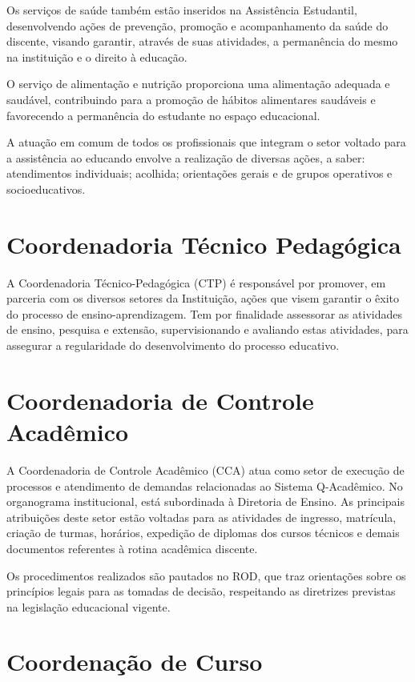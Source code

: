 \documentclass[
	12pt,				%
	openright,			%
	twoside,			%
	a4paper,			%
	chapter=TITLE,		%
	english,			%
	french,				%
	spanish,			%
	brazil,				%
	]{abntex2}
\begin{document}
Os serviços de saúde também estão inseridos na Assistência Estudantil, desenvolvendo ações de prevenção, promoção e acompanhamento da saúde do discente, visando garantir, através de suas atividades, a permanência do mesmo na instituição e o direito à educação.

O serviço de alimentação e nutrição proporciona uma alimentação adequada e saudável, contribuindo para a promoção de hábitos alimentares saudáveis e favorecendo a permanência do estudante no espaço educacional.

A atuação em comum de todos os profissionais que integram o setor voltado para a assistência ao educando envolve a realização de diversas ações, a saber: atendimentos individuais; acolhida; orientações gerais e de grupos operativos e socioeducativos.

\section{Coordenadoria Técnico Pedagógica}
A Coordenadoria Técnico-Pedagógica (CTP) é responsável por promover, em parceria com os diversos setores da Instituição, ações que visem garantir o êxito do processo de ensino-aprendizagem. Tem por finalidade assessorar as atividades de ensino, pesquisa e extensão, supervisionando e avaliando estas atividades, para assegurar a regularidade do desenvolvimento do processo educativo.


\section{Coordenadoria de Controle Acadêmico}
A Coordenadoria de Controle Acadêmico (CCA) atua como setor de execução de processos e atendimento de demandas relacionadas ao Sistema Q-Acadêmico. No organograma institucional, está subordinada à Diretoria de Ensino. As principais atribuições deste setor estão voltadas para as atividades de ingresso, matrícula, criação de turmas, horários, expedição de diplomas dos cursos técnicos e demais documentos referentes à rotina acadêmica discente.

Os procedimentos realizados são pautados no ROD, que traz orientações sobre os princípios legais para as tomadas de decisão, respeitando as diretrizes previstas na legislação educacional vigente.


\section{Coordenação de Curso}
\end{document}
